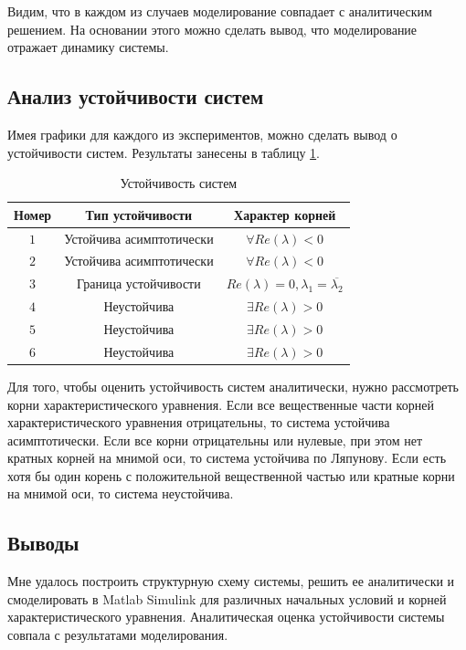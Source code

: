 Видим, что в каждом из случаев моделирование совпадает с аналитическим решением. 
На основании этого можно сделать вывод, что моделирование отражает динамику системы. 

\subsection{Анализ устойчивости систем}

Имея графики для каждого из экспериментов, можно сделать вывод о устойчивости систем. 
Результаты занесены в таблицу \ref{tab:stability}.

\begin{table}[hb!]
    \centering
    \begin{tabular}{|c|c|c|}
        \hline
        Номер & Тип устойчивости & Характер корней\\
        \hline
        $1$ & Устойчива асимптотически & $\forall Re(\lambda) < 0$ \\
        \hline
        $2$ & Устойчива асимптотически  & $\forall Re(\lambda) < 0$ \\
        \hline
        $3$ & Граница устойчивости & $Re(\lambda) = 0,\lambda_1 = \overline{\lambda_2}$ \\
        \hline
        $4$ & Неустойчива & $\exists Re(\lambda) > 0$ \\
        \hline
        $5$ & Неустойчива & $\exists Re(\lambda) > 0$ \\
        \hline
        $6$ & Неустойчива & $\exists Re(\lambda) > 0$ \\
        \hline
    \end{tabular}
    \caption{Устойчивость систем}
    \label{tab:stability}
\end{table}

Для того, чтобы оценить устойчивость систем аналитически, нужно
рассмотреть корни характеристического уравнения.
Если все вещественные части корней характеристического уравнения отрицательны, 
то система устойчива асимптотически. Если все корни отрицательны или нулевые,
при этом нет кратных корней на мнимой оси, то система устойчива по Ляпунову. 
Если есть хотя бы один корень с положительной вещественной частью или кратные 
корни на мнимой оси, то система неустойчива.

\FloatBarrier
\subsection{Выводы}
Мне удалось построить структурную схему системы, решить ее аналитически и
смоделировать в Matlab Simulink для различных начальных условий и корней характеристического уравнения.
Аналитическая оценка устойчивости системы совпала с результатами моделирования. 

